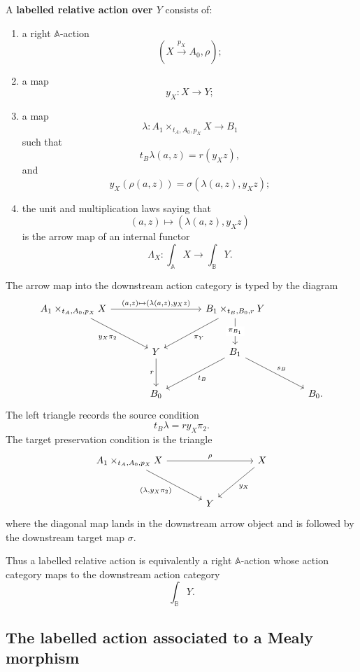 \begin{definition}
\label{def:poly-relative-labelled-action}
A \textbf{labelled relative action over \(Y\)} consists of:
\begin{enumerate}
\item a right \(\mathbb A\)-action
\[
(X\xrightarrow{p_X}A_0,\rho);
\]
\item a map
\[
y_X:X\to Y;
\]
\item a map
\[
\lambda:
A_1\times_{t_A,A_0,p_X}X\to B_1
\]
such that
\[
t_B\lambda(a,z)=r(y_Xz),
\]
and
\[
y_X(\rho(a,z))
=
\sigma(\lambda(a,z),y_Xz);
\]
\item the unit and multiplication laws saying that
\[
(a,z)\longmapsto(\lambda(a,z),y_Xz)
\]
is the arrow map of an internal functor
\[
\Lambda_X:\int_{\mathbb A}X\to\int_{\mathbb B}Y.
\]
\end{enumerate}
\end{definition}

The arrow map into the downstream action category is typed by the diagram
\[
\begin{tikzcd}[column sep=large,row sep=large]
A_1\times_{t_A,A_0,p_X}X
  \arrow[rr,"{(a,z)\mapsto(\lambda(a,z),y_Xz)}"]
  \arrow[dr,"y_X\pi_2"']
&&
B_1\times_{t_B,B_0,r}Y
  \arrow[dl,"\pi_Y"]
  \arrow[d,"\pi_{B_1}" description]
\\
&
Y
  \arrow[d,"r"']
&
B_1
  \arrow[dl,"t_B"]
  \arrow[dr,"s_B"]
\\
&
B_0
&&
B_0 .
\end{tikzcd}
\]
The left triangle records the source condition
\[
t_B\lambda=r y_X\pi_2.
\]
The target preservation condition is the triangle
\[
\begin{tikzcd}[column sep=large,row sep=large]
A_1\times_{t_A,A_0,p_X}X
  \arrow[rr,"\rho"]
  \arrow[dr,"{(\lambda,y_X\pi_2)}"']
&&
X
  \arrow[dl,"y_X"]
\\
&
Y
&
\end{tikzcd}
\]
where the diagonal map lands in the downstream arrow object and is followed by
the downstream target map \(\sigma\).

Thus a labelled relative action is equivalently a right \(\mathbb A\)-action
whose action category maps to the downstream action category
\[
\int_{\mathbb B}Y.
\]

\subsection{The labelled action associated to a Mealy morphism}
\label{subsec:poly-relative-mealy-labelled-action}

